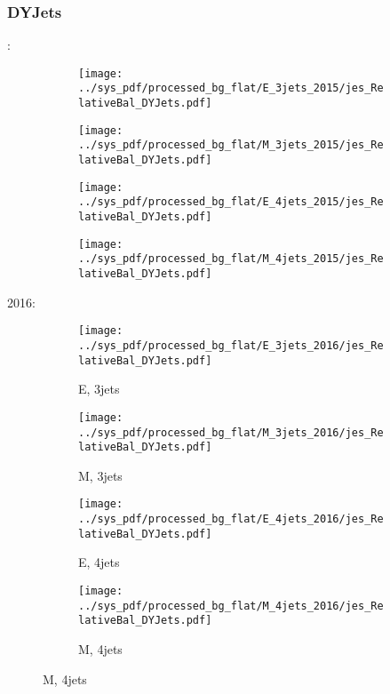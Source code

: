 \documentclass{beamer}
\begin{document}
\begin{frame}
\frametitle{DYJets}
\fontsize{5}{1}:
\begin{figure}
\centering
\begin{subfigure}[b]{0.24\textwidth}
\texttt{[image: ../sys\_pdf/processed\_bg\_flat/E\_3jets\_2015/jes\_RelativeBal\_DYJets.pdf]}
\end{subfigure}
\begin{subfigure}[b]{0.24\textwidth}
\texttt{[image: ../sys\_pdf/processed\_bg\_flat/M\_3jets\_2015/jes\_RelativeBal\_DYJets.pdf]}
\end{subfigure}
\begin{subfigure}[b]{0.24\textwidth}
\texttt{[image: ../sys\_pdf/processed\_bg\_flat/E\_4jets\_2015/jes\_RelativeBal\_DYJets.pdf]}
\end{subfigure}
\begin{subfigure}[b]{0.24\textwidth}
\texttt{[image: ../sys\_pdf/processed\_bg\_flat/M\_4jets\_2015/jes\_RelativeBal\_DYJets.pdf]}
\end{subfigure}
\end{figure}
2016:
\begin{figure}
\centering
\begin{subfigure}[b]{0.24\textwidth}
\texttt{[image: ../sys\_pdf/processed\_bg\_flat/E\_3jets\_2016/jes\_RelativeBal\_DYJets.pdf]}
\captionsetup{font=tiny}
\caption{E, 3jets}
\end{subfigure}
\begin{subfigure}[b]{0.24\textwidth}
\texttt{[image: ../sys\_pdf/processed\_bg\_flat/M\_3jets\_2016/jes\_RelativeBal\_DYJets.pdf]}
\captionsetup{font=tiny}
\caption{M, 3jets}
\end{subfigure}
\begin{subfigure}[b]{0.24\textwidth}
\texttt{[image: ../sys\_pdf/processed\_bg\_flat/E\_4jets\_2016/jes\_RelativeBal\_DYJets.pdf]}
\captionsetup{font=tiny}
\caption{E, 4jets}
\end{subfigure}
\begin{subfigure}[b]{0.24\textwidth}
\texttt{[image: ../sys\_pdf/processed\_bg\_flat/M\_4jets\_2016/jes\_RelativeBal\_DYJets.pdf]}
\captionsetup{font=tiny}
\caption{M, 4jets}
\end{subfigure}
\end{figure}
\end{frame}
\end{document}
